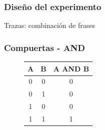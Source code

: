 \documentclass[mathserif, blue]{beamer}%
\begin{document}
\begin{frame}
	\frametitle{Diseño del experimento}
	
	Trazas: combinación de frases
	
\end{frame}

\begin{frame}
\frametitle{Compuertas - AND}
\begin{figure}
\begin{tabular}{cc|c}
A & B & A AND B \\
\hline
0 & 0 & 0\\
0 & 1 & 0\\
1 & 0 & 0\\
1 & 1 & 1
\end{tabular}
\end{figure}
\end{frame}

\end{document}
